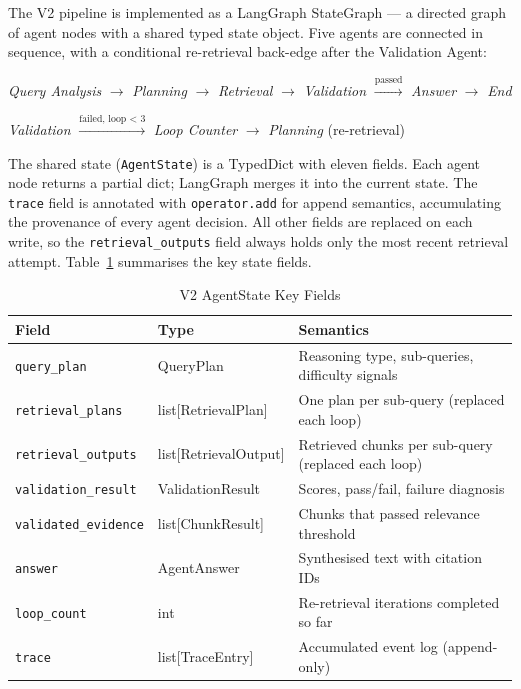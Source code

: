 The V2 pipeline is implemented as a LangGraph StateGraph
\citep{langgraph2024} — a directed graph of agent nodes with a shared
typed state object. Five agents are connected in sequence, with a conditional
re-retrieval back-edge after the Validation Agent:

\begin{center}
\textit{Query Analysis} $\rightarrow$ \textit{Planning} $\rightarrow$
\textit{Retrieval} $\rightarrow$ \textit{Validation}
$\xrightarrow{\text{passed}}$ \textit{Answer} $\rightarrow$ \textit{End}
\end{center}
\begin{center}
\textit{Validation} $\xrightarrow{\text{failed, loop < 3}}$
\textit{Loop Counter} $\rightarrow$ \textit{Planning} \quad (re-retrieval)
\end{center}

The shared state (\texttt{AgentState}) is a TypedDict with eleven fields.
Each agent node returns a partial dict; LangGraph merges it into the
current state. The \texttt{trace} field is annotated with
\texttt{operator.add} for append semantics, accumulating the provenance
of every agent decision. All other fields are replaced on each write, so
the \texttt{retrieval\_outputs} field always holds only the most recent
retrieval attempt. Table~\ref{tab:v2_state} summarises the key state fields.

\begin{table}[H]
\centering
\caption{V2 AgentState Key Fields}
\label{tab:v2_state}
\begin{tabular}{lll}
\toprule
\textbf{Field} & \textbf{Type} & \textbf{Semantics} \\
\midrule
\texttt{query\_plan}        & QueryPlan               & Reasoning type, sub-queries, difficulty signals \\
\texttt{retrieval\_plans}   & list[RetrievalPlan]     & One plan per sub-query (replaced each loop) \\
\texttt{retrieval\_outputs} & list[RetrievalOutput]   & Retrieved chunks per sub-query (replaced each loop) \\
\texttt{validation\_result} & ValidationResult        & Scores, pass/fail, failure diagnosis \\
\texttt{validated\_evidence}& list[ChunkResult]       & Chunks that passed relevance threshold \\
\texttt{answer}             & AgentAnswer             & Synthesised text with citation IDs \\
\texttt{loop\_count}        & int                     & Re-retrieval iterations completed so far \\
\texttt{trace}              & list[TraceEntry]        & Accumulated event log (append-only) \\
\bottomrule
\end{tabular}
\end{table}


